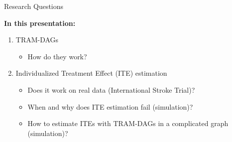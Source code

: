 \documentclass[onlytextwidth,english]{beamer}\usepackage[]{graphicx}\usepackage[]{xcolor}
\begin{document}
\begin{frame}{Research Questions}


\textbf{In this presentation:}


\begin{enumerate}
    \item TRAM-DAGs
    
    \begin{itemize}
        \item How do they work?
    \end{itemize}
    
    \item Individualized Treatment Effect (ITE) estimation
    \begin{itemize}
        \item Does it work on real data (International Stroke Trial)?
        \item When and why does ITE estimation fail (simulation)?
        \item How to estimate ITEs with TRAM-DAGs in a complicated graph (simulation)?
    \end{itemize}
\end{enumerate}
\end{frame}
\end{document}
